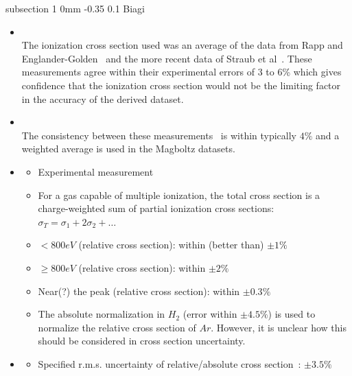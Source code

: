 \documentclass[11pt]{article}
\makeatletter
\renewcommand{\subsection}{\@startsection
{subsection}%
{1}%
{0mm}%
{-0.35\baselineskip}%
{0.1\baselineskip}%
{\normalfont\large\bfseries\color{myTan}}}%
\makeatother
\begin{document}
\subsection{Biagi}
\begin{itemize}
\item \cite{Pitchford2013}\\
The ionization cross section used was an average of the data from Rapp and Englander-Golden~\cite{Rapp1965} and the more recent data of Straub et al~\cite{Straub1995}.
These measurements agree within their experimental errors of 3 to 6\% which gives confidence that the ionization cross section would not be the limiting factor in the accuracy of the derived dataset.
\item \cite{Pitchford2017}\\
The consistency between these measurements~\cite{Rapp1965,Straub1995} is within typically $4\%$ and a weighted average is used in the Magboltz datasets.
\item \cite{Rapp1965}
\begin{itemize}
\item Experimental measurement
\item For a gas capable of multiple ionization, the total cross section is a charge-weighted sum of partial ionization cross sections: $\sigma_T = \sigma_1 + 2\sigma_2 + \ldots$
\item $<800 eV$ (relative cross section): within (better than) $\pm 1\%$
\item $\ge 800 eV$ (relative cross section): within $\pm 2\%$
\item Near(?) the peak (relative cross section): within $\pm 0.3\%$
\item The absolute normalization in $H_2$ (error within $\pm 4.5\%$) is used to normalize the relative cross section of $Ar$.
However, it is unclear how this should be considered in cross section uncertainty.
\end{itemize}
\item \cite{Straub1995}
\begin{itemize}
\item Specified r.m.s. uncertainty of relative/absolute cross section~\cite[Table 1]{Straub1995}: $\pm 3.5\%$
\end{itemize}
\end{itemize}
\end{document}
